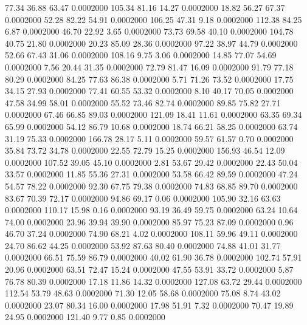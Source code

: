   77.34   36.88   63.47   0.0002000
 105.34   81.16   14.27   0.0002000
  18.82   56.27   67.37   0.0002000
  52.28   82.22   54.91   0.0002000
 106.25   47.31    9.18   0.0002000
 112.38   84.25    6.87   0.0002000
  46.70   22.92    3.65   0.0002000
  73.73   69.58   40.10   0.0002000
 104.78   40.75   21.80   0.0002000
  20.23   85.09   28.36   0.0002000
  97.22   38.97   44.79   0.0002000
  52.66   67.43   31.06   0.0002000
 108.16    9.75    3.06   0.0002000
  14.85   77.07   54.69   0.0002000
   7.56   20.44   31.35   0.0002000
  72.79   81.47   16.09   0.0002000
  91.79   77.18   80.29   0.0002000
  84.25   77.63   86.38   0.0002000
   5.71   71.26   73.52   0.0002000
  17.75   34.15   27.93   0.0002000
  77.41   60.55   53.32   0.0002000
   8.10   40.17   70.05   0.0002000
  47.58   34.99   58.01   0.0002000
  55.52   73.46   82.74   0.0002000
  89.85   75.82   27.71   0.0002000
  67.46   66.85   89.03   0.0002000
 121.09   18.41   11.61   0.0002000
  63.35   69.34   65.99   0.0002000
  54.12   86.79   10.68   0.0002000
  18.74   66.21   58.25   0.0002000
  63.74   31.19   75.33   0.0002000
 166.78   28.17    5.11   0.0002000
  59.57   61.57    0.70   0.0002000
  35.84   73.72   34.78   0.0002000
  22.55   72.79   15.25   0.0002000
 156.93   46.54   12.09   0.0002000
 107.52   39.05   45.10   0.0002000
   2.81   53.67   29.42   0.0002000
  22.43   50.04   33.57   0.0002000
  11.85   55.36   27.31   0.0002000
  53.58   66.42   89.59   0.0002000
  47.24   54.57   78.22   0.0002000
  92.30   67.75   79.38   0.0002000
  74.83   68.85   89.70   0.0002000
  83.67   70.39   72.17   0.0002000
  94.86   69.17    0.06   0.0002000
 105.90   32.16   63.63   0.0002000
 110.17   15.98    0.16   0.0002000
  93.19   36.49   59.75   0.0002000
  63.24   10.64   74.00   0.0002000
  23.96   39.94   39.90   0.0002000
  85.97   75.23   87.09   0.0002000
   0.96   46.70   37.24   0.0002000
  74.90   68.21    4.02   0.0002000
 108.11   59.96   49.11   0.0002000
  24.70   86.62   44.25   0.0002000
  53.92   87.63   80.40   0.0002000
  74.88   41.01   31.77   0.0002000
  66.51   75.59   86.79   0.0002000
  40.02   61.90   36.78   0.0002000
 102.74   57.91   20.96   0.0002000
  63.51   72.47   15.24   0.0002000
  47.55   53.91   33.72   0.0002000
   5.87   76.78   80.39   0.0002000
  17.18   11.86   14.32   0.0002000
 127.08   63.72   29.44   0.0002000
 112.54   53.79   48.63   0.0002000
  71.30   12.05   58.68   0.0002000
  75.08    8.74   43.02   0.0002000
  23.07   80.34   16.00   0.0002000
  17.98   51.91    7.32   0.0002000
  70.47   19.89   24.95   0.0002000
 121.40    9.77    0.85   0.0002000
